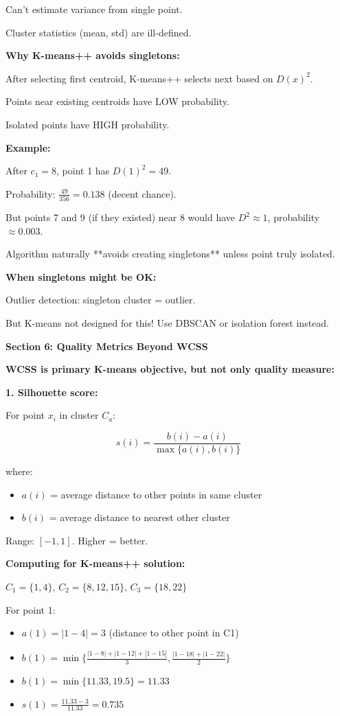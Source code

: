 \documentclass[12pt]{article}
\begin{document}
\begin{explanation}
Can't estimate variance from single point.

Cluster statistics (mean, std) are ill-defined.

\textbf{Why K-means++ avoids singletons:}

After selecting first centroid, K-means++ selects next based on $D(x)^2$.

Points near existing centroids have LOW probability.

Isolated points have HIGH probability.

\textbf{Example:}

After $c_1=8$, point 1 has $D(1)^2 = 49$.

Probability: $\frac{49}{356} = 0.138$ (decent chance).

But points 7 and 9 (if they existed) near 8 would have $D^2 \approx 1$, probability $\approx 0.003$.

Algorithm naturally **avoids creating singletons** unless point truly isolated.

\textbf{When singletons might be OK:}

Outlier detection: singleton cluster = outlier.

But K-means not designed for this! Use DBSCAN or isolation forest instead.

\textbf{Section 6: Quality Metrics Beyond WCSS}

\textbf{WCSS is primary K-means objective, but not only quality measure:}

\textbf{1. Silhouette score:}

For point $x_i$ in cluster $C_a$:

\[
s(i) = \frac{b(i) - a(i)}{\max\{a(i), b(i)\}}
\]

where:
\begin{itemize}
    \item $a(i)$ = average distance to other points in same cluster
    \item $b(i)$ = average distance to nearest other cluster
\end{itemize}

Range: $[-1, 1]$. Higher = better.

\textbf{Computing for K-means++ solution:}

$C_1 = \{1, 4\}$, $C_2 = \{8, 12, 15\}$, $C_3 = \{18, 22\}$

For point 1:
\begin{itemize}
    \item $a(1) = |1-4| = 3$ (distance to other point in C1)
    \item $b(1) = \min\{\frac{|1-8|+|1-12|+|1-15|}{3}, \frac{|1-18|+|1-22|}{2}\}$
    \item $b(1) = \min\{11.33, 19.5\} = 11.33$
    \item $s(1) = \frac{11.33 - 3}{11.33} = 0.735$
\end{itemize}


\end{explanation}
\end{document}
